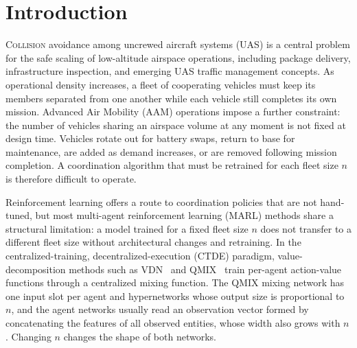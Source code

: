 \section{Introduction}
\label{sec:intro}
\lettrine{C}{ollision} avoidance among uncrewed aircraft systems (UAS) is a central problem
for the safe scaling of low-altitude airspace operations, including package delivery,
infrastructure inspection, and emerging UAS traffic management concepts. As operational
density increases, a fleet of cooperating vehicles must keep its members separated from one
another while each vehicle still completes its own mission.
Advanced Air Mobility (AAM) operations impose a further constraint: the number of vehicles
sharing an airspace volume at any moment is not fixed at design time. Vehicles rotate out
for battery swaps, return to base for maintenance, are added as demand increases, or are
removed following mission completion. A coordination algorithm that must be retrained for
each fleet size $n$ is therefore difficult to operate.

Reinforcement learning offers a route to coordination policies that are not hand-tuned,
but most multi-agent reinforcement learning (MARL) methods share a structural limitation:
a model trained for a fixed fleet size $n$ does not transfer to a different fleet size
without architectural changes and retraining. In the centralized-training,
decentralized-execution (CTDE) paradigm, value-decomposition methods such as
VDN~\cite{vdn} and QMIX~\cite{qmix} train per-agent action-value functions through a
centralized mixing function. The QMIX mixing network has one input slot per agent and
hypernetworks whose output size is proportional to $n$, and the agent networks usually read
an observation vector formed by concatenating the features of all observed entities, whose
width also grows with $n$. Changing $n$ changes the shape of both networks.

